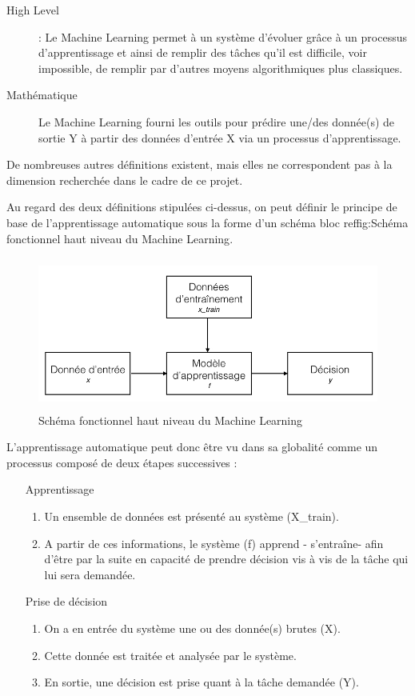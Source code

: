 \begin{description}
	\item[High Level]: Le Machine Learning permet à un système d'évoluer grâce à un processus d'apprentissage et ainsi de remplir des tâches qu'il est difficile, voir impossible, de remplir par d'autres moyens algorithmiques plus classiques. 
	\item[Mathématique] Le Machine Learning fourni les outils pour prédire une/des donnée(s) de sortie Y à partir des données d'entrée X via un processus d'apprentissage. 
\end{description}
 
 De nombreuses autres définitions existent, mais elles ne correspondent pas à la dimension recherchée dans le cadre de ce projet.
 
Au regard des deux définitions stipulées ci-dessus, on peut définir le principe de base de l'apprentissage automatique sous la forme d'un schéma bloc 	ref{fig:Schéma fonctionnel haut niveau du Machine Learning}.

\begin{figure}[h]
	\centering\includegraphics[height=5cm]{images/ML_high_level.jpeg}
	\caption{Schéma fonctionnel haut niveau du Machine Learning}
	\label{fig:Schéma fonctionnel haut niveau du Machine Learning}
\end{figure}

L'apprentissage automatique peut donc être vu dans sa globalité comme un processus composé de deux étapes successives : 
\begin{enumerate}
		\item [Apprentissage]
		 \begin{enumerate}
			\item  Un ensemble de données est présenté au système (X\_train).
			\item A partir de ces informations, le système (f) apprend - s'entraîne- afin d'être par la suite en capacité de prendre décision vis à vis de la tâche qui lui sera demandée. 
		\end{enumerate}
		
		\item [Prise de décision] 
		\begin{enumerate}
			\item  On a en entrée du système une ou des donnée(s) brutes (X).  
			\item Cette donnée est traitée et analysée par le système.
			\item En sortie, une décision est prise quant à la tâche demandée (Y). 
		\end{enumerate}
\end{enumerate}


